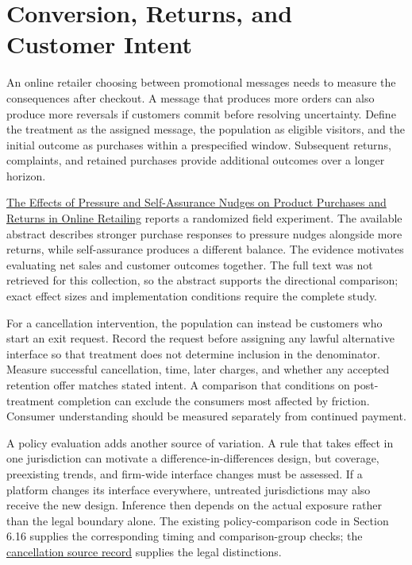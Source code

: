 \hypertarget{M06-conversion-returns-and-customer-intent}{%
\section{Conversion, Returns, and Customer
Intent}\label{M06-conversion-returns-and-customer-intent}}

\noindent \noindent An online retailer choosing between promotional messages needs
to measure the consequences after checkout. A message that produces more
orders can also produce more reversals if customers commit before
resolving uncertainty. Define the treatment as the assigned message, the
population as eligible visitors, and the initial outcome as purchases
within a prespecified window. Subsequent returns, complaints, and
retained purchases provide additional outcomes over a longer horizon.

\href{https://doi.org/10.1177/00222437231180494}{The Effects of Pressure
and Self-Assurance Nudges on Product Purchases and Returns in Online
Retailing} reports a randomized field experiment. The available abstract
describes stronger purchase responses to pressure nudges alongside more
returns, while self-assurance produces a different balance. The evidence
motivates evaluating net sales and customer outcomes together. The full
text was not retrieved for this collection, so the abstract supports the
directional comparison; exact effect sizes and implementation conditions
require the complete study.

For a cancellation intervention, the population can instead be customers
who start an exit request. Record the request before assigning any
lawful alternative interface so that treatment does not determine
inclusion in the denominator. Measure successful cancellation, time,
later charges, and whether any accepted retention offer matches stated
intent. A comparison that conditions on post-treatment completion can
exclude the consumers most affected by friction. Consumer understanding
should be measured separately from continued payment.

A policy evaluation adds another source of variation. A rule that takes
effect in one jurisdiction can motivate a difference-in-differences
design, but coverage, preexisting trends, and firm-wide interface
changes must be assessed. If a platform changes its interface
everywhere, untreated jurisdictions may also receive the new design.
Inference then depends on the actual exposure rather than the legal
boundary alone. The existing policy-comparison code in Section 6.16
supplies the corresponding timing and comparison-group checks; the
\href{../01_Resources/13_Consumer_Agency_and_Recent_Research/Policy/README.md}{cancellation
source record} supplies the legal distinctions.

